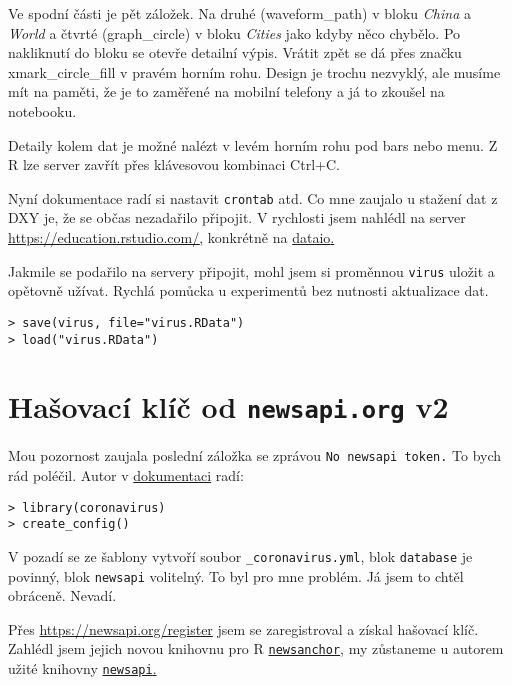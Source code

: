 Ve spodní části je pět záložek. Na druhé (waveform\_path) v bloku \textit{China} a \textit{World} a čtvrté (graph\_circle) v bloku \textit{Cities} jako kdyby něco chybělo. Po nakliknutí do bloku se otevře detailní výpis. Vrátit zpět se dá přes značku xmark\_circle\_fill v pravém horním rohu. Design je trochu nezvyklý, ale musíme mít na paměti, že je to zaměřené na mobilní telefony a já to zkoušel na notebooku.

Detaily kolem dat je možné nalézt v levém horním rohu pod bars nebo menu. Z R lze server zavřít přes klávesovou kombinaci Ctrl+C.

Nyní dokumentace radí si nastavit \texttt{crontab} atd. Co mne zaujalo u stažení dat z DXY je, že se občas nezadařilo připojit. V rychlosti jsem nahlédl na server \href{https://education.rstudio.com/}{\url{https://education.rstudio.com/},} konkrétně na \href{https://rstudio-education.github.io/hopr/dataio.html}{\url{dataio}.}

Jakmile se podařilo na servery připojit, mohl jsem si proměnnou \texttt{virus} uložit a opětovně užívat. Rychlá pomůcka u experimentů bez nutnosti aktualizace dat.

\begin{lstlisting}
> save(virus, file="virus.RData")
> load("virus.RData")
\end{lstlisting}


\section{Hašovací klíč od \texttt{newsapi.org} v2}

Mou pozornost zaujala poslední záložka se zprávou \texttt{No newsapi token.} To bych rád poléčil. Autor v \href{https://coronavirus.john-coene.com/#/prod}{dokumentaci} radí:

\begin{lstlisting}
> library(coronavirus)
> create_config()
\end{lstlisting}

V pozadí se ze šablony vytvoří soubor \texttt{\_coronavirus.yml}, blok \texttt{database} je povinný, blok \texttt{newsapi} volitelný. To byl pro mne problém. Já jsem to chtěl obráceně. Nevadí.

Přes \url{https://newsapi.org/register} jsem se zaregistroval a získal hašovací klíč. Zahlédl jsem jejich novou knihovnu pro R \href{https://cran.r-project.org/web/packages/newsanchor/index.html}{\texttt{newsanchor},} my zůstaneme u autorem užité knihovny \href{https://github.com/news-r/newsapi}{\texttt{newsapi}.} 

